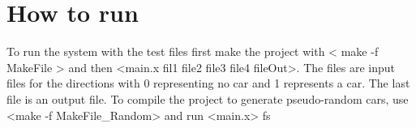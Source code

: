 
\section{How to run}
To run the system with the test files first make the project with < make -f MakeFile > and then <main.x fil1 file2 file3 file4 fileOut>. The files are input files for the directions with 0 representing no car and 1 represents a car. The last file is an output file. To compile the project to generate pseudo-random cars, use <make -f MakeFile_Random> and run <main.x> fs